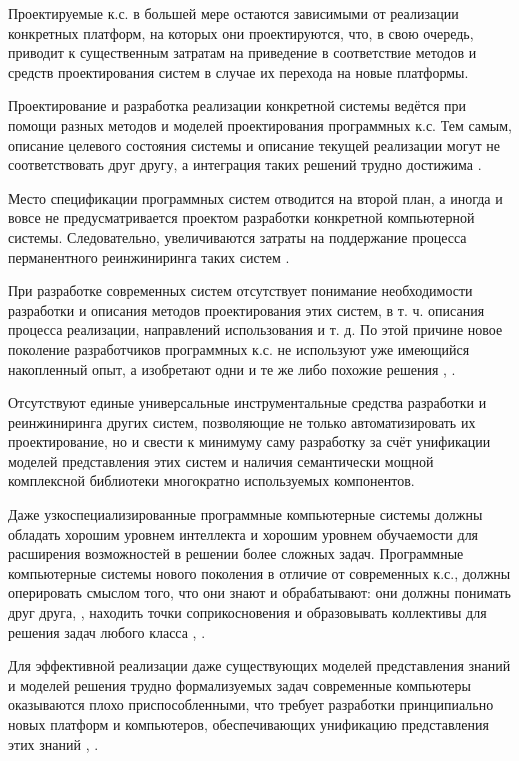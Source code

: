 \begin{textitemize}
   \item Проектируемые к.с. в большей мере остаются зависимыми от реализации конкретных платформ, на которых они проектируются, что, в свою очередь, приводит к существенным затратам на приведение в соответствие методов и средств проектирования систем в случае их перехода на новые платформы.
   \item Проектирование и разработка реализации конкретной системы ведётся при помощи разных методов и моделей проектирования программных к.с. Тем самым, описание целевого состояния системы и описание текущей реализации могут не соответствовать друг другу, а интеграция таких решений трудно достижима .
   \item Место спецификации программных систем отводится на второй план, а иногда и вовсе не предусматривается проектом разработки конкретной компьютерной системы. Следовательно, увеличиваются затраты на поддержание процесса перманентного реинжиниринга таких систем .
   \item При разработке современных систем отсутствует понимание необходимости разработки и описания методов проектирования этих систем, в т. ч. описания процесса реализации, направлений использования и т. д. По этой причине новое поколение разработчиков программных к.с. не используют уже имеющийся накопленный опыт, а изобретают одни и те же либо похожие решения , .
   \item Отсутствуют единые универсальные инструментальные средства разработки \cite{kabilan2007ontology} и реинжиниринга других систем, позволяющие не только автоматизировать их проектирование, но и свести к минимуму саму разработку за счёт унификации моделей представления этих систем и наличия семантически мощной комплексной библиотеки многократно используемых компонентов.
   \item Даже узкоспециализированные программные компьютерные системы должны обладать хорошим уровнем интеллекта и хорошим уровнем обучаемости для расширения возможностей в решении более сложных задач. Программные компьютерные системы нового поколения в отличие от современных к.с., должны оперировать смыслом того, что они знают и обрабатывают: они должны понимать друг друга, \cite{ouksel1999semantic}, \cite{neiva2016towards} находить точки соприкосновения и образовывать коллективы для решения задач любого класса , \cite{zhou2022cognitive}.
   \item Для эффективной реализации даже существующих моделей представления знаний и моделей решения трудно формализуемых задач современные компьютеры оказываются плохо приспособленными, что требует разработки принципиально новых платформ и компьютеров, обеспечивающих унификацию представления этих знаний \cite{hagoort2009semantic}, \cite{siekmann1984universal}.
\end{textitemize}

